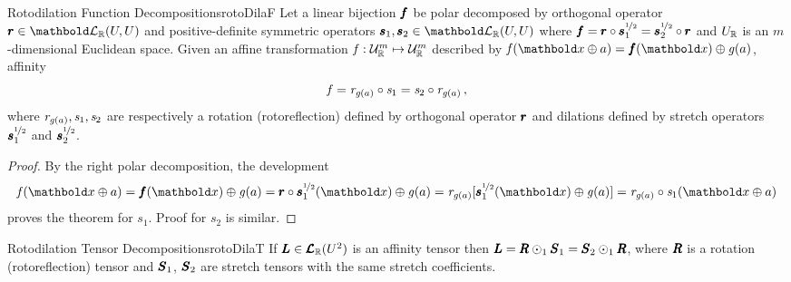 \begin{mteo}{Rotodilation Function Decompositions}{rotoDilaF}
Let a linear bijection $\vtf{f}$ be polar decomposed by orthogonal operator $\vtf{r}\in\evl{\real}{U}{U}$ and positive-definite symmetric operators $\vtf{s}_1,\vtf{s}_2\in\evl{\real}{U}{U}$ where $\vtf{f}=\vtf{r}\circ\vtf{s}_1^{\nicefrac{1}{2}}=\vtf{s}_2^{\nicefrac{1}{2}}\circ\vtf{r}$ and $U_\real$ is an $m$-dimensional Euclidean space. Given an affine transformation $\map{\mathit{f}}{\eamd{U}{R}{m}}{\eamd{U}{R}{m}}$ described by $\fua{\mathit{f}}{\vto{x}\oplus a}=\fua{\vtf{f}}{\vto{x}}\oplus\fua{\mathit{g}}{a}$, affinity
\begin{equation*}
\mathit{f} = \mathit{r}_{\fua{\mathit{g}}{a}}\circ\mathit{s}_1=\mathit{s}_2\circ\mathit{r}_{\fua{\mathit{g}}{a}}\,,
\end{equation*}
where $\mathit{r}_{\fua{\mathit{g}}{a}},\mathit{s}_1,\mathit{s}_2$ are respectively a rotation (rotoreflection) defined by orthogonal operator $\vtf{r}$ and dilations defined by stretch operators $\vtf{s}_1^{\nicefrac{1}{2}}$ and $\vtf{s}_2^{\nicefrac{1}{2}}$.  
\end{mteo}

{\footnotesize
\begin{proof}
By the right polar decomposition, the development 
\begin{equation*}
\fua{\mathit{f}}{\vto{x}\oplus a}=\fua{\vtf{f}}{\vto{x}}\oplus \fua{\mathit{g}}{a}=\fua{\vtf{r}\circ\vtf{s}_1^{\nicefrac{1}{2}}}{\vto{x}}\oplus \fua{\mathit{g}}{a}=\mathit{r}_{\fua{\mathit{g}}{a}}[\fua{\vtf{s}_1^{\nicefrac{1}{2}}}{\vto{x}}\oplus \fua{\mathit{g}}{a}]=\mathit{r}_{\fua{\mathit{g}}{a}}\circ\mathit{s}_1(\vto{x}\oplus a) 
\end{equation*}
proves the theorem for $\mathit{s}_1$. Proof for $\mathit{s}_2$ is similar.
\end{proof}}


\begin{mcoro}{Rotodilation Tensor Decompositions}{rotoDilaT}
If $\tnr{L}\in\ete{\cam{R}}{U^2}$ is an affinity tensor then $\tnr{L}=\tnr{R}\odot_1\tnr{S}_1=\tnr{S}_2\odot_1\tnr{R}$, where $\tnr{R}$ is a rotation (rotoreflection) tensor and $\tnr{S}_1$, $\tnr{S}_2$ are stretch tensors with the same stretch coefficients. 
\end{mcoro}


